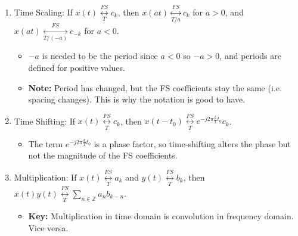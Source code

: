 \begin{definition}
\begin{enumerate}
        \item Time Scaling: If \( x(t) \underset{T}{\overset{FS}{\longleftrightarrow}} c_k \), then \( x(at) \underset{T/a}{\overset{FS}{\longleftrightarrow}}c_k \) for \( a > 0 \), and \( x(at) \underset{T/(-a)}{\overset{FS}{\longleftrightarrow}} c_{-k} \) for \( a < 0 \).
        \begin{itemize}
            \item $-a$ is needed to be the period since $a<0$ so $-a>0$, and periods are defined for positive values. 
            \item \textbf{Note:} Period has changed, but the FS coefficients stay the same (i.e. spacing changes). This is why the notation is good to have. 
        \end{itemize}
    
        \item Time Shifting: If \( x(t) \underset{T}{\overset{FS}{\longleftrightarrow}} c_k \), then \( x(t - t_0) \underset{T}{\overset{FS}{\longleftrightarrow}}  e^{-j 2\pi \frac{k}{T} t_0} c_k \).
        \begin{itemize}
            \item The term \( e^{-j 2\pi \frac{k}{T} t_0} \) is a phase factor, so time-shifting alters the phase but not the magnitude of the FS coefficients.
        \end{itemize}
    
        \item Multiplication: If \( x(t) \underset{T}{\overset{FS}{\longleftrightarrow}} a_k \) and \( y(t) \underset{T}{\overset{FS}{\longleftrightarrow}} b_k \), then \( x(t) y(t) \underset{T}{\overset{FS}{\longleftrightarrow}} \sum_{n \in \mathbb{Z}} a_n b_{k-n} \).
        \begin{itemize}
            \item \textbf{Key:} Multiplication in time domain is convolution in frequency domain. Vice versa.
        \end{itemize}
    \end{enumerate}     
\end{definition}

